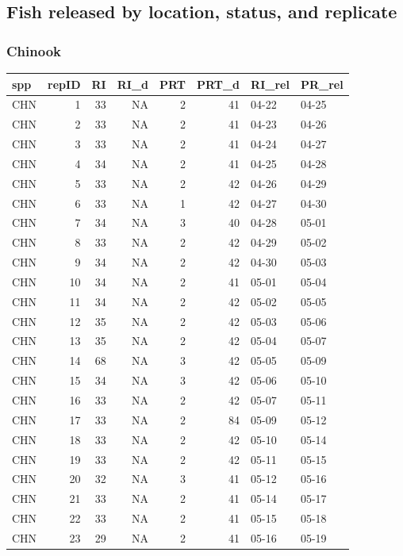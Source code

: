 \documentclass[
]{article}
\begin{document}
\subsection{Fish released by location, status, and
replicate}\label{fish-released-by-location-status-and-replicate}

\subsubsection{Chinook}\label{chinook}

\begin{table}
\centering
\begin{tabular}[t]{l|r|r|r|r|r|l|l}
\hline
spp & repID & RI & RI\_d & PRT & PRT\_d & RI\_rel & PR\_rel\\
\hline
CHN & 1 & 33 & NA & 2 & 41 & 04-22 & 04-25\\
\hline
CHN & 2 & 33 & NA & 2 & 41 & 04-23 & 04-26\\
\hline
CHN & 3 & 33 & NA & 2 & 41 & 04-24 & 04-27\\
\hline
CHN & 4 & 34 & NA & 2 & 41 & 04-25 & 04-28\\
\hline
CHN & 5 & 33 & NA & 2 & 42 & 04-26 & 04-29\\
\hline
CHN & 6 & 33 & NA & 1 & 42 & 04-27 & 04-30\\
\hline
CHN & 7 & 34 & NA & 3 & 40 & 04-28 & 05-01\\
\hline
CHN & 8 & 33 & NA & 2 & 42 & 04-29 & 05-02\\
\hline
CHN & 9 & 34 & NA & 2 & 42 & 04-30 & 05-03\\
\hline
CHN & 10 & 34 & NA & 2 & 41 & 05-01 & 05-04\\
\hline
CHN & 11 & 34 & NA & 2 & 42 & 05-02 & 05-05\\
\hline
CHN & 12 & 35 & NA & 2 & 42 & 05-03 & 05-06\\
\hline
CHN & 13 & 35 & NA & 2 & 42 & 05-04 & 05-07\\
\hline
CHN & 14 & 68 & NA & 3 & 42 & 05-05 & 05-09\\
\hline
CHN & 15 & 34 & NA & 3 & 42 & 05-06 & 05-10\\
\hline
CHN & 16 & 33 & NA & 2 & 42 & 05-07 & 05-11\\
\hline
CHN & 17 & 33 & NA & 2 & 84 & 05-09 & 05-12\\
\hline
CHN & 18 & 33 & NA & 2 & 42 & 05-10 & 05-14\\
\hline
CHN & 19 & 33 & NA & 2 & 42 & 05-11 & 05-15\\
\hline
CHN & 20 & 32 & NA & 3 & 41 & 05-12 & 05-16\\
\hline
CHN & 21 & 33 & NA & 2 & 41 & 05-14 & 05-17\\
\hline
CHN & 22 & 33 & NA & 2 & 41 & 05-15 & 05-18\\
\hline
CHN & 23 & 29 & NA & 2 & 41 & 05-16 & 05-19\\
\hline
\end{tabular}
\end{table}
\end{document}
